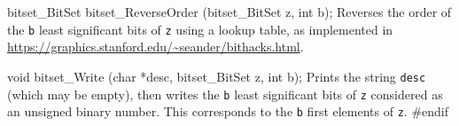 bitset_BitSet bitset_ReverseOrder (bitset_BitSet z, int b);
\endcode
\tab Reverses the order of the {\tt b} least significant bits of {\tt z} using
    a lookup table, as implemented in \url{https://graphics.stanford.edu/~seander/bithacks.html}.
\endtab
\code

void bitset_Write (char *desc, bitset_BitSet z, int b);
\endcode
  \tab
  Prints the string {\tt desc} (which may be empty), then writes the {\tt b}
	least significant bits of {\tt z} considered as an unsigned binary number.
  This corresponds to the {\tt b} first elements of {\tt z}.
 \endtab
\code\hide
#endif
\endhide\endcode
